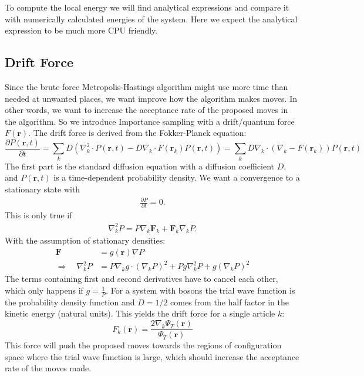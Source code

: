 \documentclass[12pt,a4paper,english]{article}
\begin{document}
To compute the local energy we will find analytical expressions and compare it with numerically calculated energies of the system. Here we expect the analytical expression to be much more CPU friendly.

\subsection{Drift Force}
\label{subsect:F}
Since the brute force Metropolis-Hastings algorithm might use more time than needed at unwanted places, we want improve how the algorithm makes moves. In other words, we want to increase the acceptance rate of the proposed moves in the algorithm. So we introduce Importance sampling with a drift/quantum force $F(\textbf{r})$. The drift force is derived from the Fokker-Planck equation:
\begin{equation}
\label{eq:Fokker-Planck}
\frac{\partial P(\textbf{r},t)}{\partial t}=\sum_{k}D\left(\nabla_k^2\cdot P(\textbf{r},t)-D\nabla_k\cdot F(\textbf{r}_k)P(\textbf{r},t)\right)=\sum_{k}D\nabla_k\cdot(\nabla_k-F(\textbf{r}_k))P(\textbf{r},t)
\end{equation}
The first part is the standard diffusion equation with a diffusion coefficient $D$, and $P(\textbf{r},t)$ is a time-dependent probability density. We want a convergence to a stationary state with
\begin{align*}
\frac{\partial P}{\partial t}=0.
\end{align*}
This is only true if
\begin{align*}
\nabla_k^2 P=P\nabla_k \textbf{F}_k+\textbf{F}_k\nabla_k P.
\end{align*}
With the assumption of stationary densities:
\begin{align*}
\textbf{F}&=g(\textbf{r})\nabla P\\
\Rightarrow\quad \nabla_k^2 P&=P\nabla_k g\cdot(\nabla_k P)^2+Pg\nabla_k^2 P+g(\nabla_k P)^2
\end{align*}
The terms containing first and second derivatives have to cancel each other, which only happens if $g=\frac{1}{P}$. For a system with bosons the trial wave function is the probability density function and $D=1/2$ comes from the half factor in the kinetic energy (natural units). This yields the drift force for a single article $k$:
\begin{equation}
\label{eq:F}
F_k(\textbf{r})=\frac{2\nabla_k\Psi_T(\textbf{r})}{\Psi_T(\textbf{r})}
\end{equation}
This force will push the proposed moves towards the regions of configuration space where the trial wave function is large, which should increase the acceptance rate of the moves made.
\end{document}
